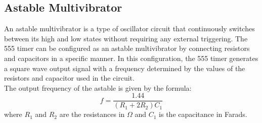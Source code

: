 \documentclass[12pt]{article}
\begin{document}
\subsection{Astable Multivibrator}
An astable multivibrator is a type of oscillator circuit that continuously switches between its high and low states without requiring any external triggering. The 555 timer can be configured as an astable multivibrator by connecting resistors and capacitors in a specific manner. In this configuration, the 555 timer generates a square wave output signal with a frequency determined by the values of the resistors and capacitor used in the circuit.\\
The output frequency of the astable is given by the formula:
\begin{equation}
    f = \frac{1.44}{(R_1 + 2R_2)C_1}
\end{equation}
where $R_1$ and $R_2$ are the resistances in $\Omega$ and $C_1$ is the capacitance in Farads.\\
\end{document}
